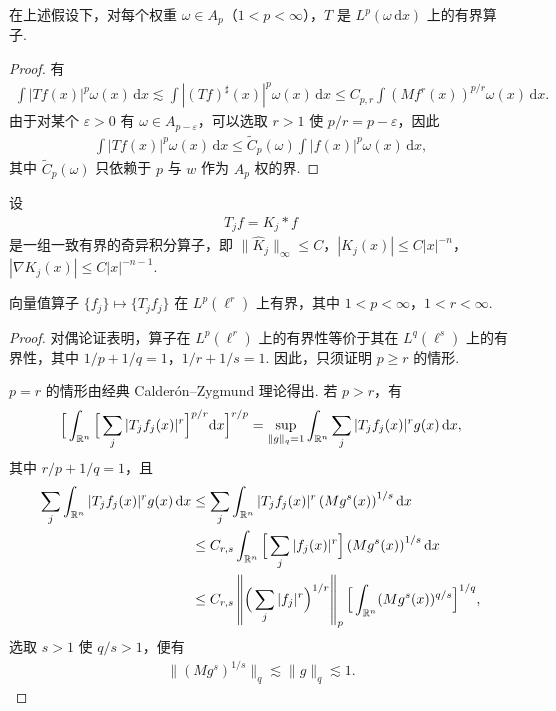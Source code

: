 \begin{corollary}\label{cor:4.21}
在上述假设下，对每个权重 $\omega \in A_p$（$1 < p < \infty$），$T$ 是 $L^p(\omega\,\mathrm{d}x)$ 上的有界算子.
\end{corollary}

\begin{proof}
有
\begin{align*}
  \int|T f(x)|^{p}\omega(x)\,\mathrm{d}x
  \lesssim\int|(T f)^{\sharp}(x)|^{p}\omega(x)\,\mathrm{d}x
  \leq C_{p,r}\int(M f^{r}(x))^{p/r}\omega(x)\,\mathrm{d}x.
\end{align*}
由于对某个 $\varepsilon > 0$ 有 $\omega \in A_{p-\varepsilon}$，可以选取 $r > 1$ 使 $p/r = p - \varepsilon$，因此
\begin{align*}
  \int|T f(x)|^{p}\omega(x)\,\mathrm{d}x
  \leq\widetilde{C}_{p}(\omega)\int|f(x)|^{p}\omega(x)\,\mathrm{d}x,
\end{align*}
其中 $\widetilde{C}_{p}(\omega)$ 只依赖于 $p$ 与 $w$ 作为 $A_{p}$ 权的界.
\end{proof}

设
\begin{align*}
  T_{j}f=K_{j}*f
\end{align*}
是一组一致有界的奇异积分算子，即 $\|\widehat{K}_j\|_\infty \leq C$，$|K_j(x)| \leq C|x|^{-n}$，$|\nabla K_j(x)| \leq C|x|^{-n-1}$.

\begin{theorem}\label{thm:4.22}
向量值算子 $\{f_j\} \mapsto \{T_j f_j\}$ 在 $L^p(\ell^r)$ 上有界，其中 $1 < p < \infty$，$1 < r < \infty$.
\end{theorem}

\begin{proof}
对偶论证表明，算子在 $L^p(\ell^r)$ 上的有界性等价于其在 $L^q(\ell^s)$ 上的有界性，其中 $1/p + 1/q = 1$，$1/r + 1/s = 1$. 因此，只须证明 $p \geq r$ 的情形.

$p = r$ 的情形由经典 Calderón--Zygmund 理论得出. 若 $p > r$，有
\begin{align*}
  \Big[\int_{\mathbb{R}^{n}}\Big[\sum_{j}|T_{j}f_{j}(x)|^{r}\Big]^{p/r}\mathrm{d}x\Big]^{r/p}
  =\sup_{\|g\|_{q}=1}\int_{\mathbb{R}^{n}}\sum_{j}|T_{j}f_{j}(x)|^{r}g(x)\,\mathrm{d}x,
\end{align*}
其中 $r/p + 1/q = 1$，且
\begin{align*}
  \sum_{j}\int_{\mathbb{R}^{n}}|T_{j} f_{j}(x)|^{r} g(x)\,\mathrm{d}x
  &\leq\sum_{j}\int_{\mathbb{R}^{n}}|T_{j} f_{j}(x)|^{r}\left(Mg^{s}(x)\right)^{1/s}\mathrm{d}x\\
  &\leq C_{r,s}\int_{\mathbb{R}^{n}}\Big[\sum_{j}|f_{j}(x)|^{r}\Big]\left(Mg^{s}(x)\right)^{1/s}\mathrm{d}x\\
  &\leq C_{r,s}\left\|\Big(\sum_{j}|f_{j}|^{r}\Big)^{1/r}\right\|_{p}
   \Big[\int_{\mathbb{R}^{n}}(Mg^{s}(x))^{q/s}\Big]^{1/q},
\end{align*}
选取 $s > 1$ 使 $q/s > 1$，便有
\begin{align*}
  \|(M g^{s})^{1/s}\|_{q}\lesssim\|g\|_{q}\lesssim 1.
\end{align*}
\end{proof}

